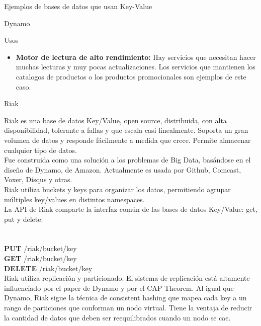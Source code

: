 \begin{section}{Ejemplos de bases de datos que usan Key-Value}
\begin{subsection}{Dynamo}
\begin{subsubsection}{Usos}
\begin{itemize}
\item \textbf{Motor de lectura de alto rendimiento:} Hay servicios que necesitan hacer muchas lecturas y muy pocas actualizaciones. Los servicios que mantienen los catalogos de productos o los productos promocionales son ejemplos de este caso.\\

\end{itemize}

\end{subsubsection}

\end{subsection}

\begin{subsection}{Riak}

Riak es una base de datos Key/Value, open source, distribuida, con alta disponibilidad, tolerante a fallas y que escala casi linealmente. Soporta un gran volumen de datos y responde fácilmente a medida que crece. Permite almacenar cualquier tipo de datos.\\

Fue construida como una solución a los problemas de Big Data, basándose en el diseño de Dynamo, de Amazon. Actualmente es usada por Github, Comcast, Voxer, Disqus y otras.\\

Riak utiliza buckets y keys para organizar los datos, permitiendo agrupar múltiples key/values en distintos namespaces. \\

La API de Riak comparte la interfaz común de las bases de datos Key/Value: get, put y delete:\\
\\ \\
\textbf{PUT}    /riak/bucket/key \\
\textbf{GET}    /riak/bucket/key \\
\textbf{DELETE} /riak/bucket/key \\

Riak utiliza replicación y particionado. El sistema de replicación está altamente influenciado por el paper de Dynamo y por el CAP Theorem. Al igual que Dynamo, Riak sigue la técnica de consistent hashing que mapea cada key a un rango de particiones que conforman un nodo virtual. Tiene la ventaja de reducir la cantidad de datos que deben ser reequilibrados cuando un nodo se cae. \\


\end{subsection}
\end{section}
